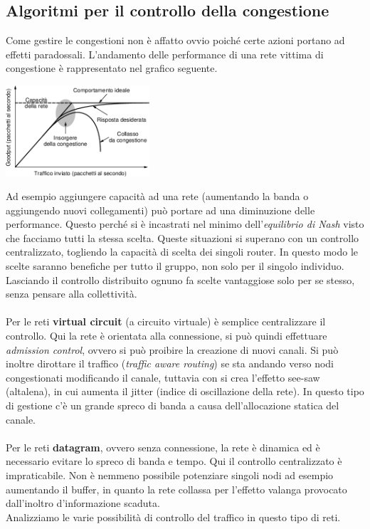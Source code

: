 \documentclass[10pt,a4paper,twoside]{article}
\begin{document}
\subsection{Algoritmi per il controllo della congestione}
Come gestire le congestioni non è affatto ovvio poiché certe azioni portano ad effetti paradossali. L'andamento delle performance di una rete vittima di congestione è rappresentato nel grafico seguente.
\begin{center}
\includegraphics[width=0.4\textwidth]{images/congestione.png}
\end{center}
Ad esempio aggiungere capacità ad una rete (aumentando la banda o aggiungendo nuovi collegamenti) può portare ad una diminuzione delle performance. Questo perché si è incastrati nel minimo dell'\textit{equilibrio di Nash} visto che facciamo tutti la stessa scelta. Queste situazioni si superano con un controllo centralizzato, togliendo la capacità di scelta dei singoli router. In questo modo le scelte saranno benefiche per tutto il gruppo, non solo per il singolo individuo. Lasciando il controllo distribuito ognuno fa scelte vantaggiose solo per se stesso, senza pensare alla collettività.\\\\
Per le reti \textbf{virtual circuit} (a circuito virtuale) è semplice centralizzare il controllo. Qui la rete è orientata alla connessione, si può quindi effettuare \textit{admission control}, ovvero si può proibire la creazione di nuovi canali. Si può inoltre dirottare il traffico (\textit{traffic aware routing}) se sta andando verso nodi congestionati modificando il canale, tuttavia con si crea l'effetto see-saw (altalena), in cui aumenta il jitter (indice di oscillazione della rete). In questo tipo di gestione c'è un grande spreco di banda a causa dell'allocazione statica del canale.\\\\
Per le reti \textbf{datagram}, ovvero senza connessione, la rete è dinamica ed è necessario evitare lo spreco di banda e tempo. Qui il controllo centralizzato è impraticabile. Non è nemmeno possibile potenziare singoli nodi ad esempio aumentando il buffer, in quanto la rete collassa per l'effetto valanga provocato dall'inoltro d'informazione scaduta.\\
Analizziamo le varie possibilità di controllo del traffico in questo tipo di reti.
\end{document}
